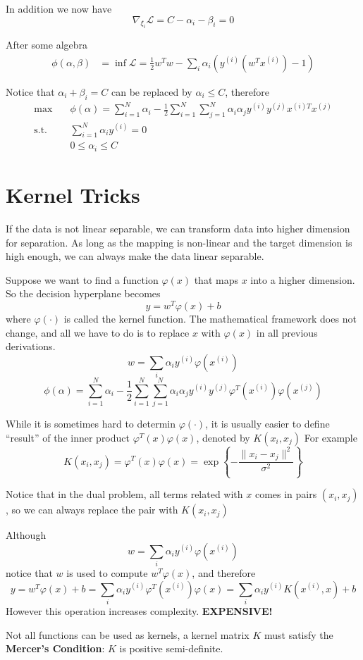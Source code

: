     In addition we now have
    \[ \nabla_{\xi_i}\mathcal{L} = C - \alpha_i - \beta_i = 0 \]

    After some algebra
    \begin{align*}
        \phi(\alpha, \beta) &= \inf\mathcal{L} = \frac{1}{2}w^Tw - \sum_i \alpha_i(y^{(i)}(w^Tx^{(i)})-1)
    \end{align*}

    Notice that $\alpha_i + \beta_i = C$ can be replaced by $\alpha_i \le C$, therefore
    \begin{align*}
        \max \quad &\phi(\alpha) = \sum_{i=1}^N\alpha_i - \frac{1}{2}\sum_{i=1}^N\sum_{j=1}^N \alpha_i\alpha_j y^{(i)}y^{(j)} x^{(i)T}x^{(j)}\\
        \text{s.t.} \quad & \sum_{i=1}^N \alpha_i y^{(i)} = 0\\
        \quad & 0 \le \alpha_i \le C
    \end{align*}


\section{Kernel Tricks}
    If the data is not linear separable, we can transform data into higher dimension for separation. As long as the mapping is non-linear and the target dimension is high enough, we can always make the data linear separable.

    Suppose we want to find a function $\varphi(x)$ that maps $x$ into a higher dimension. So the decision hyperplane becomes
    \[ y = w^T\varphi(x) + b \]
    where $\varphi(\cdot)$ is called the kernel function.
    The mathematical framework does not change, and all we have to do is to replace $x$ with $\varphi(x)$ in all previous derivations.
    \[ w = \sum_i \alpha_i y^{(i)}\varphi(x^{(i)}) \]
    \[ \phi(\alpha) = \sum_{i=1}^N\alpha_i - \frac{1}{2}\sum_{i=1}^N\sum_{j=1}^N \alpha_i\alpha_j y^{(i)}y^{(j)} \varphi^T(x^{(i)})\varphi(x^{(j)}) \]

    While it is sometimes hard to determin $\varphi(\cdot)$, it is usually easier to define ``result'' of the inner product $\varphi^T(x)\varphi(x)$, denoted by $K(x_i, x_j)$ For example
    \[ K(x_i, x_j) = \varphi^T(x)\varphi(x) = \exp\left\{ -\frac{\|x_i-x_j\|^2}{\sigma^2} \right\} \]

    Notice that in the dual problem, all terms related with $x$ comes in pairs $(x_i,x_j)$, so we can always replace the pair with $K(x_i,x_j)$

    \begin{remark}
        Although
        \[ w = \sum_i \alpha_i y^{(i)}\varphi(x^{(i)}) \]
        notice that $w$ is used to compute $w^T \varphi(x)$, and therefore
        \[ y = w^T\varphi(x) + b = \sum_i \alpha_i y^{(i)}\varphi^T(x^{(i)})\varphi(x) = \sum_i \alpha_i y^{(i)} K(x^{(i)}, x) + b \]
        However this operation increases complexity. \textbf{EXPENSIVE!}
    \end{remark}

    \begin{remark}
        Not all functions can be used as kernels, a kernel matrix $K$ must satisfy the \textbf{Mercer's Condition}: $K$ is positive semi-definite.
    \end{remark}
